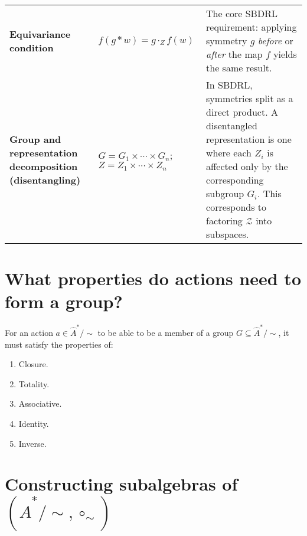 \begin{longtable}{@{}P{0.24\textwidth} P{0.26\textwidth} Q@{}}
\textbf{Equivariance condition} & \(f(g \ast w) = g \cdot_{Z} f(w)\) & The core SBDRL requirement: applying symmetry \(g\) \emph{before} or \emph{after} the map \(f\) yields the same result. \\
\textbf{Group and representation decomposition (disentangling)} & \(G = G_{1} \times \cdots \times G_{n}\); \(Z = Z_{1} \times \cdots \times Z_{n}\) & In SBDRL, symmetries split as a direct product. A disentangled representation is one where each \(Z_i\) is affected only by the corresponding subgroup \(G_i\). This corresponds to factoring \(\mathscr{Z}\) into subspaces. \\
\end{longtable}



\section{What properties do actions need to form a group?}

For an action $a \in \hat{A}^{*}/\sim$ to be able to be a member of a group $G \subseteq \hat{A}^{*}/\sim$, it must satisfy the properties of:
\begin{enumerate}
    \item Closure.
    \item Totality.
    \item Associative.
    \item Identity.
    \item Inverse.
\end{enumerate}

\section{Constructing subalgebras \texorpdfstring{of $(\hat{A}^{*}/\sim, \circ_{\sim})$}{}}

